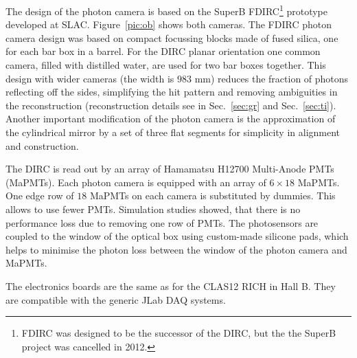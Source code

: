 The design of the photon camera is based on the SuperB FDIRC\footnote{FDIRC was designed to be the successor of the \babar DIRC, but the the SuperB project was cancelled in 2012.} prototype~\cite{fdirc} developed at SLAC. Figure~\ref{pic:ob} shows both cameras. The FDIRC photon camera design was based on compact focussing blocks made of fused silica, one for each bar box in a barrel. For the \gluex DIRC planar orientation one common camera, filled with distilled water, are used for two bar boxes together. This design with wider cameras (the width is $983$ mm) reduces the fraction of photons reflecting off the sides, simplifying the hit pattern and removing ambiguities in the reconstruction (reconstruction details see in Sec.~\ref{sec:gr} and Sec.~\ref{sec:ti}). Another important modification of the photon camera is the approximation of the cylindrical mirror by a set of three flat segments for simplicity in alignment and construction. 

The \gluex DIRC is read out by an array of Hamamatsu H12700 Multi-Anode PMTs (MaPMTs). Each photon camera is equipped with an array of $6 \times 18$ MaPMTs. One edge row of $18$ MaPMTs on each camera is substituted by dummies. This allows to use fewer PMTs. Simulation studies showed, that there is no performance loss due to removing one row of PMTs. The photosensors are coupled to the window of the optical box using custom-made silicone pads, which helps to minimise the photon loss between the window of the photon camera and MaPMTs. 

The electronics boards are the same as for the CLAS12 RICH in Hall B. They are compatible with the generic JLab DAQ systems.
